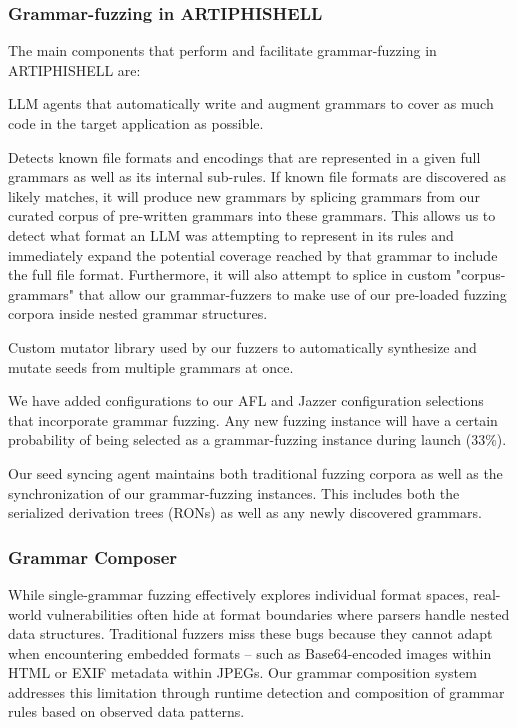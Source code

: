 \subsubsection{Grammar-fuzzing in ARTIPHISHELL}

The main components that perform and facilitate grammar-fuzzing in ARTIPHISHELL are:

 LLM agents that automatically write and augment grammars to cover as much code in the target application as possible.

 Detects known file formats and encodings that are represented in a given full grammars as well as its internal sub-rules.
If known file formats are discovered as likely matches, it will produce new grammars by splicing grammars from  our curated corpus of pre-written grammars into these grammars.
This allows us to detect what format an LLM was attempting to represent in its rules and immediately expand the potential coverage reached by that grammar to include the full file format.
Furthermore, it will also attempt to splice in custom "corpus-grammars" that allow our grammar-fuzzers to make use of our pre-loaded fuzzing corpora inside nested grammar structures.

\newpar{\revolver} Custom mutator library used by our fuzzers to automatically synthesize and mutate seeds from multiple grammars at once.

 We have added configurations to our AFL and Jazzer configuration selections that incorporate grammar fuzzing. Any new fuzzing instance will have a certain probability of being selected as a grammar-fuzzing instance during launch (33\%).


\newpar{\seedsync} Our seed syncing agent maintains both traditional fuzzing corpora as well as the synchronization of our grammar-fuzzing instances. This includes both the serialized derivation trees (RONs) as well as any newly discovered grammars.


\subsubsection{Grammar Composer}

While single-grammar fuzzing effectively explores individual format spaces, real-world vulnerabilities often hide at format boundaries where parsers handle nested data structures.
Traditional fuzzers miss these bugs because they cannot adapt when encountering embedded formats -- such as Base64-encoded images within HTML or EXIF metadata within JPEGs.
Our grammar composition system addresses this limitation through runtime detection and composition of grammar rules based on observed data patterns.

